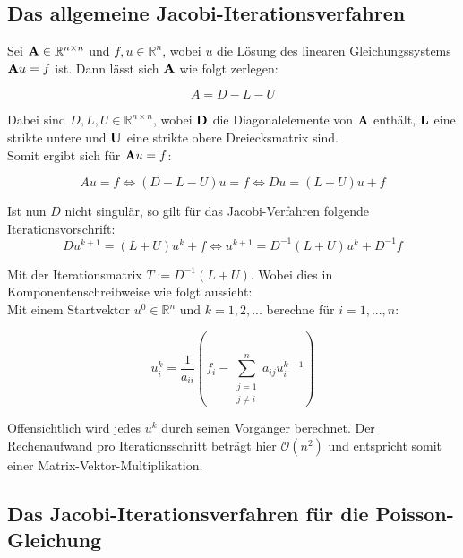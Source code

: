 \subsection{Das allgemeine Jacobi-Iterationsverfahren}\label{ss.Allgemeines Jacobi-Verfahren}

Sei ${\textbf{A}} \in \mathbb{R}^{n \times n}$ und $f,u \in \mathbb{R}^{n}$, wobei $u$ die Lösung des linearen Gleichungssystems ${\textbf{A}}u = f$ ist. Dann lässt sich ${\textbf{A}}$ wie folgt zerlegen:

\begin{equation}
A = D - L - U
\end{equation}

Dabei sind $D,L,U \in \mathbb{R}^{n \times n}$, wobei ${\textbf{D}}$ die Diagonalelemente von ${\textbf{A}}$ enthält, ${\textbf{L}}$ eine strikte untere und ${\textbf{U}}$ eine strikte obere Dreiecksmatrix sind. \\
Somit ergibt sich für ${\textbf{A}}u = f$:

\begin{equation}
Au = f \Leftrightarrow (D-L-U)u = f \Leftrightarrow Du = (L+U)u + f
\end{equation}

Ist nun $D$ nicht singulär, so gilt für das Jacobi-Verfahren folgende Iterationsvorschrift:
\begin{equation}
Du^{k+1} = (L+U)u^{k} + f \Leftrightarrow u^{k+1} = D^{-1}(L+U)u^{k} + D^{-1}f
\end{equation}

Mit der Iterationsmatrix $T := D^{-1}(L+U)$.
Wobei dies in Komponentenschreibweise wie folgt aussieht: \\
Mit einem Startvektor $u^{0} \in \mathbb{R}^{n}$ und $k=1,2,...$ berechne für $i=1,...,n$:

\begin{equation}
u^{k}_{i} = \frac {1} {a_{ii}} (f_{i} - \sum_{\substack{j = 1 \\ j \ne i}}^{n} a_{ij}u^{k-1}_{i})
\end{equation}

Offensichtlich wird jedes $u^{k}$ durch seinen Vorgänger berechnet. Der Rechenaufwand pro Iterationsschritt beträgt hier $\mathcal{O}(n^{2})$ und entspricht somit einer Matrix-Vektor-Multiplikation.

\subsection{Das Jacobi-Iterationsverfahren für die Poisson-Gleichung}\label{ss.Jacobi-Verfahren der Poisson Gleichung}

